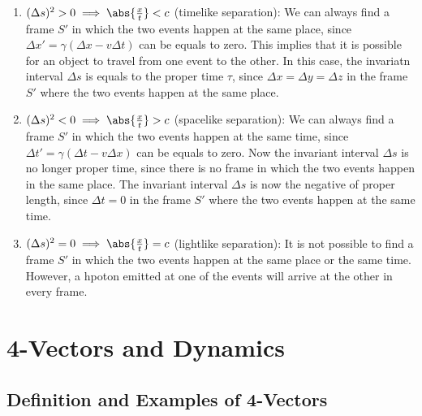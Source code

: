\documentclass[english,a4paper,12pt]{report}
\begin{document}
\begin{enumerate}
    \item \((\Delta s)^2 > 0 \implies \abs{\frac{x}{t} } < c \) (timelike separation): We can always find a frame \(S'\) in which the two events happen at the same place, since \(\Delta x' = \gamma (\Delta x - v\Delta t)\) can be equals to zero. This implies that it is possible for an object to travel from one event to the other. 
    In this case, the invariatn interval \(\Delta s\) is equals to the proper time \(\tau \), since \(\Delta x = \Delta y = \Delta z\) in the frame \(S'\) where the two events happen at the same place.    
    \item \((\Delta s)^2 < 0 \implies \abs{\frac{x}{t} } > c \) (spacelike separation): We can always find a frame \(S'\) in which the two events happen at the same time, since \(\Delta t' = \gamma (\Delta t - v\Delta x)\) can be equals to zero.
    Now the invariant interval \(\Delta s\) is no longer proper time, since there is no frame in which the two events happen in the same place. 
    The invariant interval \(\Delta s\) is now the negative of proper length, since \(\Delta t = 0\) in the frame \(S'\) where the two events happen at the same time.
    \item \((\Delta s)^2 = 0 \implies \abs{\frac{x}{t} } = c \) (lightlike separation): It is not possible to find a frame \(S'\) in which the two events happen at the same place or the same time. However, a hpoton emitted at one of the events will arrive at the other in every frame.       
\end{enumerate}























\chapter{4-Vectors and Dynamics}

\section{Definition and Examples of 4-Vectors}
\end{document}

